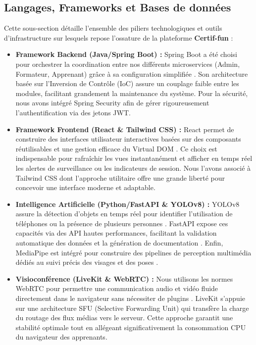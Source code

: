 \subsection{Langages, Frameworks et Bases de données}
Cette sous-section détaille l'ensemble des piliers technologiques et outils d'infrastructure sur lesquels repose l'ossature de la plateforme \textbf{Certif-fun} :

\begin{itemize}
    \item \textbf{Framework Backend (Java/Spring Boot) :}  
    Spring Boot a été choisi pour orchestrer la coordination entre nos différents microservices (Admin, Formateur, Apprenant) grâce à sa configuration simplifiée \cite{bairstow2023spring}. Son architecture basée sur l’Inversion de Contrôle (IoC) assure un couplage faible entre les modules, facilitant grandement la maintenance du système. Pour la sécurité, nous avons intégré Spring Security afin de gérer rigoureusement l’authentification via des jetons JWT.
    
    \item \textbf{Framework Frontend (React \& Tailwind CSS) :}  
    React permet de construire des interfaces utilisateur interactives basées sur des composants réutilisables et une gestion efficace du Virtual DOM \cite{minnick2022foundation}. Ce choix est indispensable pour rafraîchir les vues instantanément et afficher en temps réel les alertes de surveillance ou les indicateurs de session. Nous l’avons associé à Tailwind CSS dont l’approche utilitaire offre une grande liberté pour concevoir une interface moderne et adaptable.
    
    \item \textbf{Intelligence Artificielle (Python/FastAPI \& YOLOv8) :}  
    YOLOv8 assure la détection d’objets en temps réel pour identifier l’utilisation de téléphones ou la présence de plusieurs personnes \cite{sohan2025review}. FastAPI expose ces capacités via des API hautes performances, facilitant la validation automatique des données et la génération de documentation \cite{fastapi_docs}. Enfin, MediaPipe est intégré pour construire des pipelines de perception multimédia dédiés au suivi précis des visages et des poses \cite{lugaresi2019mediapipe}.
    
    \item \textbf{Visioconférence (LiveKit \& WebRTC) :}  
    Nous utilisons les normes WebRTC pour permettre une communication audio et vidéo fluide directement dans le navigateur sans nécessiter de plugins \cite{romano2012webrtc}. LiveKit s’appuie sur une architecture SFU (Selective Forwarding Unit) qui transfère la charge du routage des flux médias vers le serveur. Cette approche garantit une stabilité optimale tout en allégeant significativement la consommation CPU du navigateur des apprenants.
    

\end{itemize}
